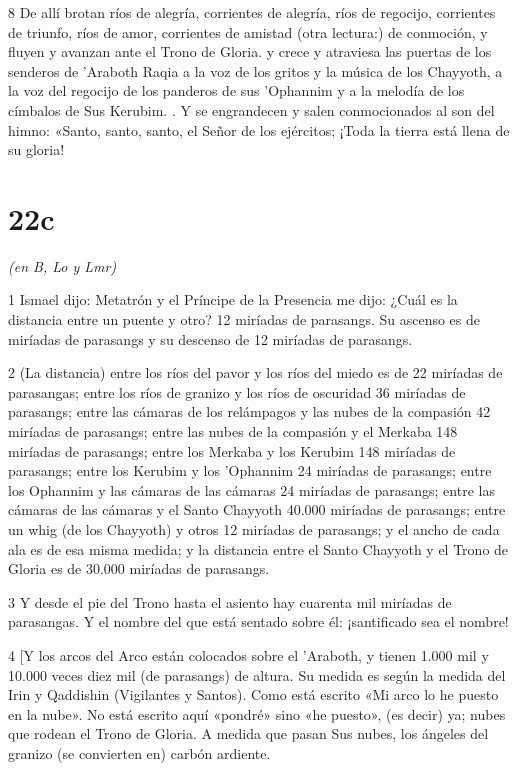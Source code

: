 \par 8 De allí brotan ríos de alegría, corrientes de alegría, ríos de regocijo, corrientes de triunfo, ríos de amor, corrientes de amistad (otra lectura:) de conmoción, y fluyen y avanzan ante el Trono de Gloria. y crece y atraviesa las puertas de los senderos de 'Araboth Raqia a la voz de los gritos y la música de los Chayyoth, a la voz del regocijo de los panderos de sus 'Ophannim y a la melodía de los címbalos de Sus Kerubim. . Y se engrandecen y salen conmocionados al son del himno: «Santo, santo, santo, el Señor de los ejércitos; ¡Toda la tierra está llena de su gloria!

\chapter{22c}

\par \textit{(en B, Lo y Lmr)}

\par 1 Ismael dijo: Metatrón y el Príncipe de la Presencia me dijo: ¿Cuál es la distancia entre un puente y otro? 12 miríadas de parasangs. Su ascenso es de miríadas de parasangs y su descenso de 12 miríadas de parasangs.

\par 2 (La distancia) entre los ríos del pavor y los ríos del miedo es de 22 miríadas de parasangas; entre los ríos de granizo y los ríos de oscuridad 36 miríadas de parasangs; entre las cámaras de los relámpagos y las nubes de la compasión 42 miríadas de parasangs; entre las nubes de la compasión y el Merkaba 148 miríadas de parasangs; entre los Merkaba y los Kerubim 148 miríadas de parasangs; entre los Kerubim y los 'Ophannim 24 miríadas de parasangs; entre los Ophannim y las cámaras de las cámaras 24 miríadas de parasangs; entre las cámaras de las cámaras y el Santo Chayyoth 40.000 miríadas de parasangs; entre un whig (de los Chayyoth) y otros 12 miríadas de parasangs; y el ancho de cada ala es de esa misma medida; y la distancia entre el Santo Chayyoth y el Trono de Gloria es de 30.000 miríadas de parasangs.

\par 3 Y desde el pie del Trono hasta el asiento hay cuarenta mil miríadas de parasangas. Y el nombre del que está sentado sobre él: ¡santificado sea el nombre!

\par 4 [Y los arcos del Arco están colocados sobre el 'Araboth, y tienen 1.000 mil y 10.000 veces diez mil (de parasangs) de altura. Su medida es según la medida del Irin y Qaddishin (Vigilantes y Santos). Como está escrito «Mi arco lo he puesto en la nube». No está escrito aquí «pondré» sino «he puesto», (es decir) ya; nubes que rodean el Trono de Gloria. A medida que pasan Sus nubes, los ángeles del granizo (se convierten en) carbón ardiente.

